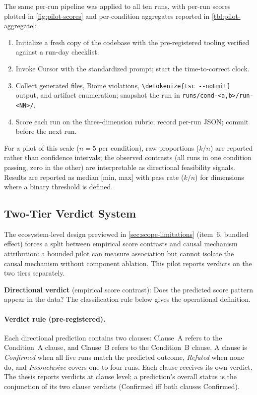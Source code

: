 \documentclass[12pt,a4paper]{report}
\newcommand{\code}[1]{\texttt{\nolinkurl{\detokenize{#1}}}}
\DeclareRobustCommand{\filename}[1]{\bgroup\urlstyle{tt}\nolinkurl{#1}\egroup}
\begin{document}
The same per-run pipeline was applied to all ten runs, with per-run scores plotted in \autoref{fig:pilot-scores} and per-condition aggregates reported in \autoref{tbl:pilot-aggregate}:
\begin{enumerate}
    \item Initialize a fresh copy of the codebase with the pre-registered tooling verified against a run-day checklist.
    \item Invoke Cursor with the standardized prompt; start the time-to-correct clock.
    \item Collect generated files, Biome violations, \code{tsc --noEmit} output, and artifact enumeration; snapshot the run in \filename{runs/cond-<a,b>/run-<NN>/}.
    \item Score each run on the three-dimension rubric; record per-run JSON; commit before the next run.
\end{enumerate}


For a pilot of this scale ($n=5$ per condition), raw proportions ($k/n$) are reported rather than confidence intervals; the observed contrasts (all runs in one condition passing, zero in the other) are interpretable as directional feasibility signals. Results are reported as median [min, max] with pass rate ($k/n$) for dimensions where a binary threshold is defined. 

\subsection{Two-Tier Verdict System}
\label{sec:pilot-verdict}

The ecosystem-level design previewed in \autoref{sec:scope-limitations} (item~6, bundled effect) forces a split between empirical score contrasts and causal mechanism attribution: a bounded pilot can measure association but cannot isolate the causal mechanism without component ablation. This pilot reports verdicts on the two tiers separately.

\textbf{Directional verdict} (empirical score contrast): Does the predicted score pattern appear in the data? The classification rule below gives the operational definition.

\paragraph{Verdict rule (pre-registered).} Each directional prediction contains two clauses: Clause~A refers to the Condition~A clause, and Clause~B refers to the Condition~B clause. A clause is \emph{Confirmed} when all five runs match the predicted outcome, \emph{Refuted} when none do, and \emph{Inconclusive} covers one to four runs. Each clause receives its own verdict. The thesis reports verdicts at clause level; a prediction's overall status is the conjunction of its two clause verdicts (Confirmed iff both clauses Confirmed).
\end{document}
